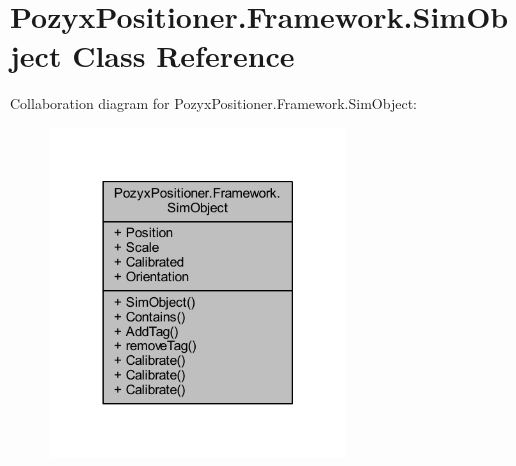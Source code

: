 \hypertarget{class_pozyx_positioner_1_1_framework_1_1_sim_object}{}\section{Pozyx\+Positioner.\+Framework.\+Sim\+Object Class Reference}
\label{class_pozyx_positioner_1_1_framework_1_1_sim_object}


Collaboration diagram for Pozyx\+Positioner.\+Framework.\+Sim\+Object\+:\nopagebreak
\begin{figure}[H]
\begin{center}
\leavevmode
\includegraphics[width=222pt]{class_pozyx_positioner_1_1_framework_1_1_sim_object__coll__graph}
\end{center}
\end{figure}
